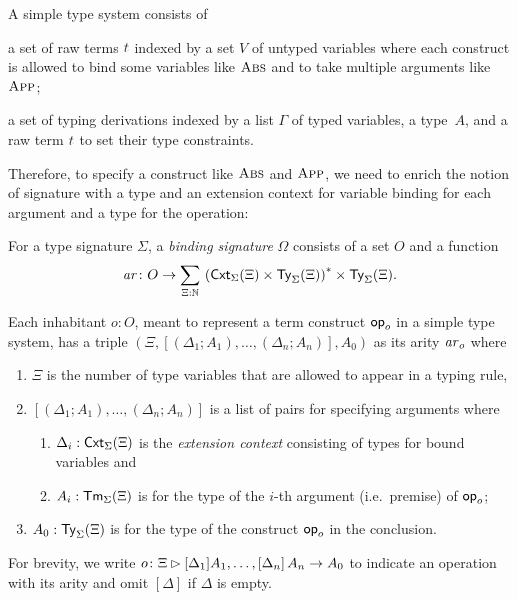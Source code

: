 A simple type system consists of
\begin{enumerate*}
  \item a set of raw terms $\isTerm{t}$ indexed by a set $V$ of untyped variables where each construct is allowed to bind some variables like $\textnormal{\textsc{Abs}}$ and to take multiple arguments like $\textnormal{\textsc{App}}$;
  \item a set of typing derivations indexed by a list $\Gamma$ of typed variables, a type~$A$, and a raw term $\isTerm{t}$ to set their type constraints. 
\end{enumerate*}
Therefore, to specify a construct like $\textnormal{\textsc{Abs}}$ and $\textnormal{\textsc{App}}$, we need to enrich the notion of signature with a type and an extension context for variable binding for each argument and a type for the operation:
\begin{definition}\label{def:binding-signature}
  For a type signature $\Sigma$, a \emph{binding signature} $\Omega$ consists of a set $O$ and a function
  \[
    \mathit{ar}\colon O \to \sm{\Xi : \N} \left(\Cxt_\Sigma(\Xi) \times \Type_\Sigma(\Xi)\right)^* \times \Type_\Sigma(\Xi).
  \]
\end{definition}
Each inhabitant $o: O$, meant to represent a term construct $\mathsf{op}_o$ in a simple type system, has a triple $\left(\Xi, \left[\left(\Delta_1; A_1\right), \ldots, \left(\Delta_{n}; A_{n}\right) \right], A_0\right)$ as its arity $\mathit{ar}_o$ where
\begin{enumerate}
  \item $\Xi$ is the number of type variables that are allowed to appear in a typing rule, 
  \item $\left[\left(\Delta_1; A_{1}\right), \ldots, \left(\Delta_{n}; A_{n}\right) \right]$ is a list of pairs for specifying arguments where
    \begin{enumerate}
      \item $\Delta_i : \mathsf{Cxt}_{\Sigma}(\Xi)$ is the \emph{extension context} consisting of types for bound variables and
      \item $A_i : \mathsf{Tm}_{\Sigma}(\Xi)$ is for the type of the $i$-th argument (i.e.\ premise) of $\mathsf{op}_{o}$;
    \end{enumerate}
  \item $A_0 : \mathsf{Ty}_\Sigma(\Xi)$ is for the type of the construct $\mathsf{op}_o$ in the conclusion.
\end{enumerate}
For brevity, we write $o\colon \Xi \rhd [\Delta_1]A_{1}, \ldots, \left[\Delta_{n}\right] A_{n} \to A_0$ to indicate an operation with its arity and omit $[\Delta]$ if $\Delta$ is empty. 
